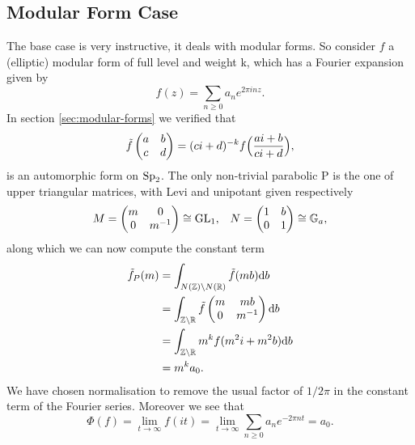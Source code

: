 \subsection{Modular Form Case}
The base case is very instructive, it deals with modular forms. So consider \(f\) a (elliptic) modular form of full level and weight k, which has a Fourier expansion given by 
\[f(z) = \sum_{n\geq 0} a_ne^{2\pi i nz }.\]
In section \ref{sec:modular-forms} we verified that 
\[\tilde f \begin{pmatrix}
	a & b\\
	c & d
\end{pmatrix} = (ci+d)^{-k} f\Bigl(\frac{ai+b}{ci+d}\Bigr),\]
is an automorphic form on \(\operatorname{Sp}_2\). The only non-trivial parabolic P is the one of upper triangular matrices, with Levi and unipotant given respectively 
\[M = \begin{pmatrix} m & 0\\ 0 & m^{-1}\end{pmatrix}\cong \operatorname{GL}_1 , \;\;\; N = \begin{pmatrix} 1 & b\\ 0 & 1\end{pmatrix} \cong \mathbb{G}_a,\]
along which we can now compute the constant term 
\begin{equation*}
	\begin{aligned}
		\tilde f_P(m)
		& = \int_{N(\Z)\backslash N(\R)}\tilde f (mb) \mathrm{d}b\\
		& =  \int_{\Z\backslash\R}\tilde f \begin{pmatrix} m & mb\\ 0 & m^{-1}\end{pmatrix}\mathrm{d}b\\
		& = \int_{\Z\backslash\R} m^k f(m^2i+m^2b) \mathrm{d}b\\
		& = m^k a_0. \\
	\end{aligned}
\end{equation*}
We have chosen normalisation to remove the usual factor of \(1/2\pi\) in the constant term of the Fourier series. Moreover we see that
\[\Phi(f)= \lim_{t\to \infty} f(it) =\lim_{t\to \infty} \sum_{n\geq 0} a_ne^{-2\pi nt }  =  a_0.\]

